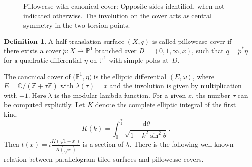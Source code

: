 \documentclass[pdftex]{sigma}
\numberwithin{equation}{section}
\theoremstyle{definition}
\newtheorem{defi}[theo]{Definition}
\renewcommand{\to}{\rightarrow}
\newcommand{\ZZ}{\mathbb{Z}}
\newcommand{\CC}{\mathbb{C}}
\newcommand{\PP}{\mathbb{P}}
\begin{document}
\begin{figure}[t]
 \centering
	\vspace{-2mm}

	\caption{Pillowcase with canonical cover: Opposite sides identified, when not indicated otherwise. The involution on the cover acts as central symmetry in the two-torsion points.} \label{fig:Pillowcase}
\end{figure}

\begin{defi} A half-translation surface $(X,q)$ is called pillowcase cover if there exists a cover $ \check{p}\colon X \to \PP^1$ branched over $D=(0,1,\infty,x)$, such that $q= \check{p}^*\eta$ for a quadratic differential $\eta$ on $\PP^1$ with simple poles at~$D$.
\end{defi}
The canonical cover of $\bigl(\PP^1,\eta\bigr)$ is the elliptic differential $(E,\omega)$, where $E=\CC/(\ZZ+\tau\ZZ)$ with $\lambda(\tau)=x$ and the involution is given by multiplication with $-1$. Here $\lambda$ is the modular lambda function.
For a given $x$, the number $\tau$ can be computed explicitly.
Let $K$ denote the complete elliptic integral of the first kind
\begin{equation} \label{eq:elliptic_integral}
	K(k) = \int_0^{\frac{\pi}{2}} \frac{\mathrm{d}\theta}{\sqrt{1-k^2\sin^2\theta}}.
\end{equation}
Then $t(x) = i\frac{K(\sqrt{1-x})}{K(\sqrt{x})}$ is a section of $\lambda$.
There is the following well-known relation between para\-llelo\-gram-tiled surfaces and pillowcase covers.
\end{document}
